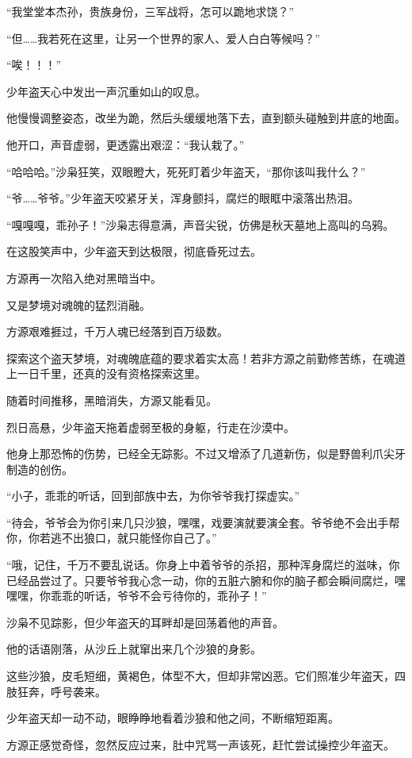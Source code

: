 \begin{this_body}
“我堂堂本杰孙，贵族身份，三军战将，怎可以跪地求饶？”

“但……我若死在这里，让另一个世界的家人、爱人白白等候吗？”

“唉！！！”

少年盗天心中发出一声沉重如山的叹息。

他慢慢调整姿态，改坐为跪，然后头缓缓地落下去，直到额头碰触到井底的地面。

他开口，声音虚弱，更透露出艰涩：“我认栽了。”

“哈哈哈。”沙枭狂笑，双眼瞪大，死死盯着少年盗天，“那你该叫我什么？”

“爷……爷爷。”少年盗天咬紧牙关，浑身颤抖，腐烂的眼眶中滚落出热泪。

“嘎嘎嘎，乖孙子！”沙枭志得意满，声音尖锐，仿佛是秋天墓地上高叫的乌鸦。

在这股笑声中，少年盗天到达极限，彻底昏死过去。

方源再一次陷入绝对黑暗当中。

又是梦境对魂魄的猛烈消融。

方源艰难捱过，千万人魂已经落到百万级数。

探索这个盗天梦境，对魂魄底蕴的要求着实太高！若非方源之前勤修苦练，在魂道上一日千里，还真的没有资格探索这里。

随着时间推移，黑暗消失，方源又能看见。

烈日高悬，少年盗天拖着虚弱至极的身躯，行走在沙漠中。

他身上那恐怖的伤势，已经全无踪影。不过又增添了几道新伤，似是野兽利爪尖牙制造的创伤。

“小子，乖乖的听话，回到部族中去，为你爷爷我打探虚实。”

“待会，爷爷会为你引来几只沙狼，嘿嘿，戏要演就要演全套。爷爷绝不会出手帮你，你若逃不出狼口，就只能怪你自己了。”

“哦，记住，千万不要乱说话。你身上中着爷爷的杀招，那种浑身腐烂的滋味，你已经品尝过了。只要爷爷我心念一动，你的五脏六腑和你的脑子都会瞬间腐烂，嘿嘿嘿，你乖乖的听话，爷爷不会亏待你的，乖孙子！”

沙枭不见踪影，但少年盗天的耳畔却是回荡着他的声音。

他的话语刚落，从沙丘上就窜出来几个沙狼的身影。

这些沙狼，皮毛短细，黄褐色，体型不大，但却非常凶恶。它们照准少年盗天，四肢狂奔，呼号袭来。

少年盗天却一动不动，眼睁睁地看着沙狼和他之间，不断缩短距离。

方源正感觉奇怪，忽然反应过来，肚中咒骂一声该死，赶忙尝试操控少年盗天。


\end{this_body}

